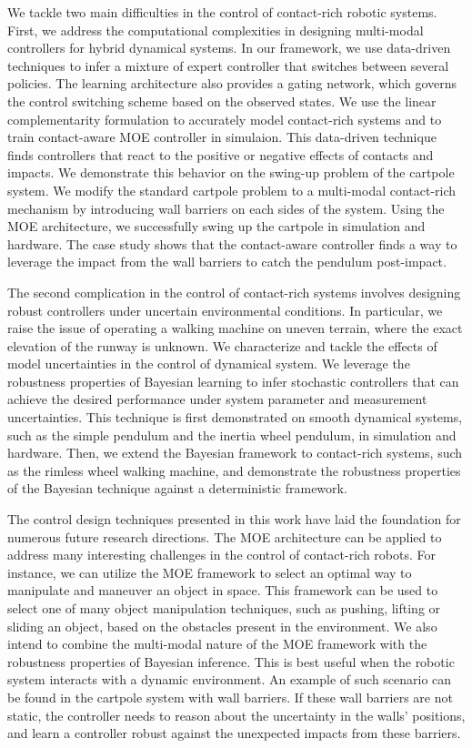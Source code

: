 We tackle two main difficulties in the control of contact-rich robotic systems.
%
First, we address the computational complexities in designing multi-modal
controllers for hybrid dynamical systems.
%
In our framework, we use data-driven techniques to infer a mixture of expert
controller that switches between several policies.
%
The learning architecture also provides a gating network, which governs the
control switching scheme based on the observed states.
%
We use the linear complementarity formulation to accurately model contact-rich
systems and to train contact-aware MOE controller in simulaion.
%
This data-driven technique finds controllers that react to the positive or
negative effects of contacts and impacts.
%
We demonstrate this behavior on the swing-up problem of the cartpole system.
%
We modify the standard cartpole problem to a multi-modal contact-rich mechanism
by introducing wall barriers on each sides of the system.
%
Using the MOE architecture, we successfully swing up the cartpole in simulation
and hardware.
%
The case study shows that the contact-aware controller finds a way to leverage
the impact from the wall barriers to catch the pendulum post-impact.
%

The second complication in the control of contact-rich systems involves
designing robust controllers under uncertain environmental conditions.
%
In particular, we raise the issue of operating a walking machine on uneven
terrain, where the exact elevation of the runway is unknown.
%
We characterize and tackle the effects of model uncertainties in the control of
dynamical system.
%
We leverage the robustness properties of Bayesian learning to infer stochastic
controllers that can achieve the desired performance under system parameter and
measurement uncertainties.
%
This technique is first demonstrated on smooth dynamical systems, such as the
simple pendulum and the inertia wheel pendulum, in simulation and hardware.
%
Then, we extend the Bayesian framework to contact-rich systems, such as the
rimless wheel walking machine, and demonstrate the robustness properties of the
Bayesian technique against a deterministic framework.

The control design techniques presented in this work have laid the foundation
for numerous future research directions.
%
The MOE architecture can be applied to address many interesting challenges in
the control of contact-rich robots.
%
For instance, we can utilize the MOE framework to select an optimal way to
manipulate and maneuver an object in space.
%
This framework can be used to select one of many object manipulation techniques,
such as pushing, lifting or sliding an object, based on the obstacles present in
the environment.
%
We also intend to combine the multi-modal nature of the MOE framework with the
robustness properties of Bayesian inference. 
%
This is best useful when the robotic system interacts with a dynamic
environment.
%
An example of such scenario can be found in the cartpole system with wall
barriers.
%
If these wall barriers are not static, the controller needs to reason about the
uncertainty in the walls' positions, and learn a controller robust against the
unexpected impacts from these barriers.
